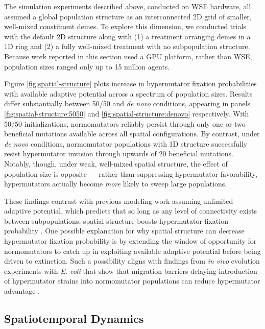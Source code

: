 The simulation experiments described above, conducted on WSE hardware, all assumed a global population structure as an interconnected 2D grid of smaller, well-mixed constituent demes.
To explore this dimension, we conducted trials with the default 2D structure along with (1) a treatment arranging demes in a 1D ring and (2) a fully well-mixed treatment with no subpopulation structure.
Because work reported in this section used a GPU platform, rather than WSE, population sizes ranged only up to 15 million agents.



Figure \ref{fig:spatial-structure} plots increase in hypermutator fixation probabilities with available adaptive potential across a spectrum of population sizes.
Results differ substantially between 50/50 and \textit{de novo} conditions, appearing in panels \ref{fig:spatial-structure:5050} and \ref{fig:spatial-structure:denovo} respectively.
With 50/50 initializations, normomutators reliably persist through only one or two beneficial mutations available across all spatial configurations.
By contrast, under \textit{de novo} conditions, normomutator populations with 1D structure successfully resist hypermutator invasion through upwards of 20 beneficial mutations.
Notably, though, under weak, well-mixed spatial structure, the effect of population size is opposite --- rather than suppressing hypermutator favorability, hypermutators actually become \textit{more} likely to sweep large populations.

These findings contrast with previous modeling work assuming unlimited adaptive potential, which predicts that so long as any level of connectivity exists between subpopulations, spatial structure boosts hypermutator fixation probability \citep{raynes2019migration}.
One possible explanation for why spatial structure can decrease hypermutator fixation probability is by extending the window of opportunity for normomutators to catch up in exploiting available adaptive potential before being driven to extinction.
Such a possibility aligns with findings from \textit{in vivo} evolution experiments with \textit{E. coli} that show that migration barriers delaying introduction of hypermutator strains into normomutator populations can reduce hypermutator advantage \citep{lechat2006escherichia}.

\subsection{Spatiotemporal Dynamics}
\label{sec:dynamics}

